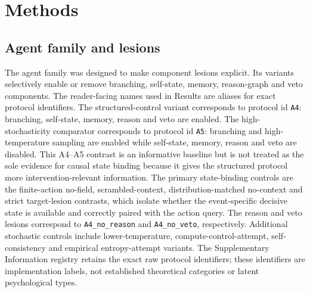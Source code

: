 ﻿\documentclass[preprint,12pt,authoryear]{elsarticle}
\begin{document}
\section{Methods}

\subsection{Agent family and lesions}

The agent family was designed to make component lesions explicit. Its variants selectively enable or remove branching, self-state, memory, reason-graph and veto components. The reader-facing names used in Results are aliases for exact protocol identifiers. The structured-control variant corresponds to protocol id \texttt{A4}: branching, self-state, memory, reason and veto are enabled. The high-stochasticity comparator corresponds to protocol id \texttt{A5}: branching and high-temperature sampling are enabled while self-state, memory, reason and veto are disabled. This A4--A5 contrast is an informative baseline but is not treated as the sole evidence for causal state binding because it gives the structured protocol more intervention-relevant information. The primary state-binding controls are the finite-action no-field, scrambled-context, distribution-matched no-context and strict target-lesion contrasts, which isolate whether the event-specific decisive state is available and correctly paired with the action query. The reason and veto lesions correspond to \texttt{A4\_no\_reason} and \texttt{A4\_no\_veto}, respectively. Additional stochastic controls include lower-temperature, compute-control-attempt, self-consistency and empirical entropy-attempt variants. The Supplementary Information registry retains the exact raw protocol identifiers; these identifiers are implementation labels, not established theoretical categories or latent psychological types.
\end{document}
